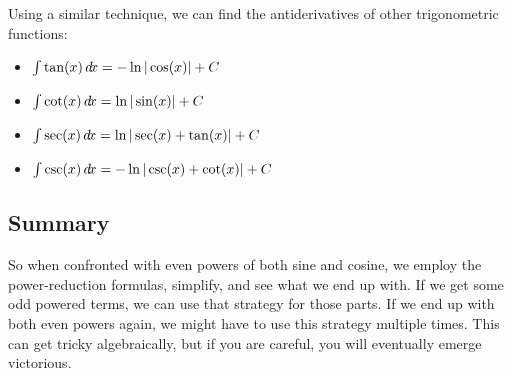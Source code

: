 \documentclass{ximera}
\begin{document}
Using a similar technique, we can find the antiderivatives of other trigonometric functions:


\begin{theorem}\hfil
  \begin{itemize}
  \item $\int \tan(x) \mathop{}\!d\! x = -\ln|\cos(x)| + C$
  \item $\int \cot(x) \mathop{}\!d\! x = \ln|\sin(x)| + C$
  \item $\int \sec(x) \mathop{}\!d\! x = \ln|\sec(x) + \tan(x)| + C$
  \item $\int \csc(x) \mathop{}\!d\! x = -\ln|\csc(x) + \cot(x)| + C$
  \end{itemize}
\end{theorem}



\subsection{Summary}

So when confronted with even powers of both sine and cosine, we employ
the power-reduction formulas, simplify, and see what we end up with.
If we get some odd powered terms, we can use that strategy for those
parts.  If we end up with both even powers again, we might have to use
this strategy multiple times.  This can get tricky algebraically, but
if you are careful, you will eventually emerge victorious.
\end{document}
